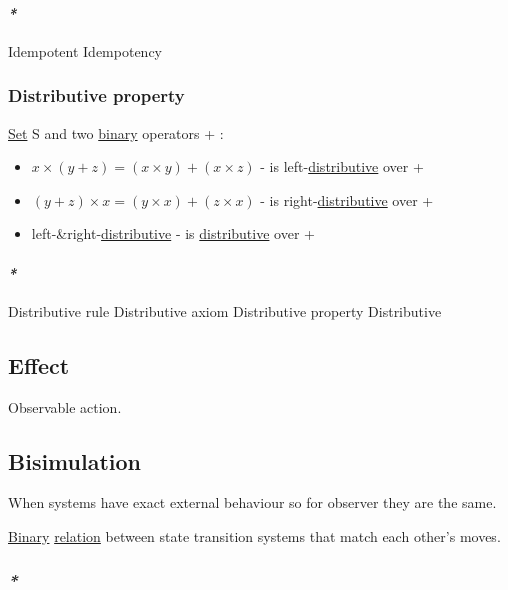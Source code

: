 \documentclass[a4paper,14pt,oneside]{book}
\begin{document}
\paragraph{\emph{*}}
\label{sec:org05e8c96}

\label{org17d3775}Idempotent
\label{org9b31460}Idempotency

\subsubsection{\label{org0d23e6b}Distributive property}
\label{sec:org3c4671f}
\hyperref[org8140fe5]{Set} S and two \hyperref[orgead9e5b]{binary} operators + \texttimes{}:

\begin{itemize}
\item \(x \times (y + z) = (x \times y) + (x \times z)\) - \texttimes{} is left-\hyperref[org6039187]{distributive} over +
\item \((y + z) \times x = (y \times x) + (z \times x)\) - \texttimes{} is right-\hyperref[org6039187]{distributive} over +
\item left-\&right-\hyperref[org6039187]{distributive} - \texttimes{} is \hyperref[org6039187]{distributive} over +
\end{itemize}

\paragraph{\emph{*}}
\label{sec:org537e02d}

\label{org0ac1ba8}Distributive rule
\label{orgf7871d9}Distributive axiom
\label{org882c3a1}Distributive property
\label{org6039187}Distributive

\subsection{\label{orged3ae6f}Effect}
\label{sec:orga35aaf0}
Observable action.

\subsection{\label{org2e654e7}Bisimulation}
\label{sec:org9c9b533}
When systems have exact external behaviour so for observer they are the same.

\hyperref[orgead9e5b]{Binary} \hyperref[orgf43c12d]{relation} between state transition systems that match each other's moves.

\subsubsection{\emph{*}}
\label{sec:org82e5f3c}
\end{document}
